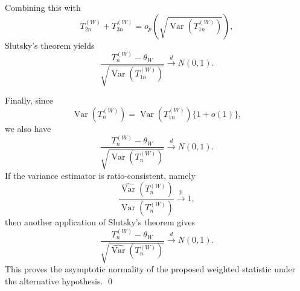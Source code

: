 \documentclass[12pt,reqno,oneside]{amsbook}
\theoremstyle{definition}
\theoremstyle{remark}
\begin{document}
Combining this with
\[
T_{2n}^{(W)}+T_{3n}^{(W)}
=
o_p\left(
\sqrt{\operatorname{Var}(T_{1n}^{(W)})}
\right),
\]
Slutsky's theorem yields
\[
\frac{
T_n^{(W)}-\theta_W
}{
\sqrt{\operatorname{Var}(T_{1n}^{(W)})}
}
\stackrel{d}{\longrightarrow}
N(0,1).
\]

Finally, since
\[
\operatorname{Var}(T_n^{(W)})
=
\operatorname{Var}(T_{1n}^{(W)})
\{1+o(1)\},
\]
we also have
\[
\frac{
T_n^{(W)}-\theta_W
}{
\sqrt{\operatorname{Var}(T_n^{(W)})}
}
\stackrel{d}{\longrightarrow}
N(0,1).
\]
If the variance estimator is ratio-consistent, namely
\[
\frac{
\widehat{\operatorname{Var}}(T_n^{(W)})
}{
\operatorname{Var}(T_n^{(W)})
}
\stackrel{p}{\longrightarrow}1,
\]
then another application of Slutsky's theorem gives
\[
\frac{
T_n^{(W)}-\theta_W
}{
\sqrt{\widehat{\operatorname{Var}}(T_n^{(W)})}
}
\stackrel{d}{\longrightarrow}
N(0,1).
\]
This proves the asymptotic normality of the proposed weighted statistic under
the alternative hypothesis. \qed


\end{document}
